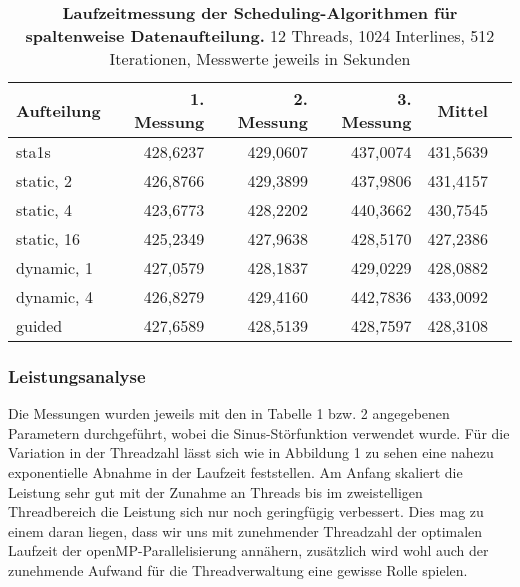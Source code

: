 \documentclass[a4paper,12pt]{scrartcl}
\begin{document}
\begin{table}[!h]
\begin{tabular}{|l|r|r|r|r|r|}
\hline
Aufteilung&1. Messung&2. Messung&3. Messung&Mittel\\
\hline
sta1s	&428,6237	&429,0607	&437,0074	&431,5639\\
\hline
static, 2	&426,8766	&429,3899	&437,9806	&431,4157\\
\hline
static, 4	&423,6773	&428,2202	&440,3662	&430,7545\\
\hline
static, 16	&425,2349	&427,9638	&428,5170	&427,2386\\
\hline
dynamic, 1	&427,0579	&428,1837	&429,0229	&428,0882\\
\hline
dynamic, 4 	&426,8279	&429,4160	&442,7836	&433,0092\\
\hline
guided	&427,6589	&428,5139	&428,7597	&428,3108\\

\hline
\end{tabular}
\caption{\textbf{Laufzeitmessung der Scheduling-Algorithmen für \\spaltenweise Datenaufteilung.} 12 Threads, 1024 Interlines, 512 \\Iterationen, Messwerte jeweils in Sekunden}
\end{table}
\subsubsection*{Leistungsanalyse}
Die Messungen wurden jeweils mit den in Tabelle 1 bzw. 2 angegebenen Parametern durchgeführt, wobei die Sinus-Störfunktion verwendet wurde. Für die Variation in der Threadzahl lässt sich wie in Abbildung 1 zu sehen eine nahezu exponentielle Abnahme in der Laufzeit feststellen. Am Anfang skaliert die Leistung sehr gut mit der Zunahme an Threads bis im zweistelligen Threadbereich die Leistung sich nur noch geringfügig verbessert. Dies mag zu einem daran liegen, dass wir uns mit zunehmender Threadzahl der optimalen Laufzeit der openMP-Parallelisierung annähern, zusätzlich wird wohl auch der zunehmende Aufwand für die Threadverwaltung eine gewisse Rolle spielen.
\end{document}
